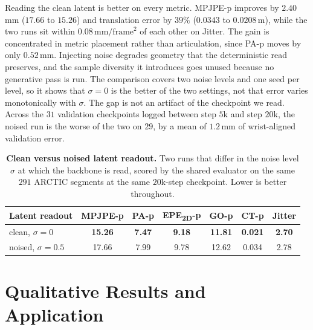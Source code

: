 \documentclass[10pt,twocolumn,letterpaper]{article}
\newcommand{\best}[1]{\textbf{#1}}
\begin{document}
Reading the clean latent is better on every metric. MPJPE-p improves by $2.40$\,mm ($17.66$ to $15.26$) and translation error by $39\%$ ($0.0343$ to $0.0208$\,m), while the two runs sit within $0.08\,\mathrm{mm}/\mathrm{frame}^2$ of each other on Jitter. The gain is concentrated in metric placement rather than articulation, since PA-p moves by only $0.52$\,mm. Injecting noise degrades geometry that the deterministic read preserves, and the sample diversity it introduces goes unused because no generative pass is run. The comparison covers two noise levels and one seed per level, so it shows that $\sigma{=}0$ is the better of the two settings, not that error varies monotonically with $\sigma$. The gap is not an artifact of the checkpoint we read. Across the $31$ validation checkpoints logged between step $5$k and step $20$k, the noised run is the worse of the two on $29$, by a mean of $1.2$\,mm of wrist-aligned validation error.

\begin{table}[!t]
\centering
\small
\setlength{\tabcolsep}{2pt}
\renewcommand{\arraystretch}{0.82}
\caption{\textbf{Clean versus noised latent readout.} Two runs that differ in the noise level $\sigma$ at which the backbone is read, scored by the shared evaluator on the same $291$ ARCTIC segments at the same $20$k-step checkpoint. Lower is better throughout.}
\label{tab:sigma}
\begin{tabular}{@{}l cccccc@{}}
\toprule
Latent readout & MPJPE-p & PA-p & EPE\textsubscript{2D}-p & GO-p & CT-p & Jitter \\
\midrule
clean, $\sigma{=}0$ & \best{15.26} & \best{7.47} & \best{9.18} & \best{11.81} & \best{0.021} & \best{2.70} \\
noised, $\sigma{=}0.5$ & 17.66 & 7.99 & 9.78 & 12.62 & 0.034 & 2.78 \\
\bottomrule
\end{tabular}
\end{table}

\section{Qualitative Results and Application}
\label{sec:supp_qualapp}
\end{document}
